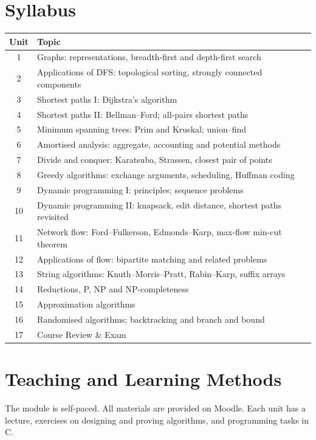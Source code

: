 \documentclass[11pt,a4paper]{article}
\begin{document}
\section{Syllabus}
\begin{tabularx}{\textwidth}{c X}
\toprule
\textbf{Unit} & \textbf{Topic} \\
\midrule
1  & Graphs: representations, breadth-first and depth-first search \\
2  & Applications of DFS: topological sorting, strongly connected components \\
3  & Shortest paths I: Dijkstra's algorithm \\
4  & Shortest paths II: Bellman--Ford; all-pairs shortest paths \\
5  & Minimum spanning trees: Prim and Kruskal; union--find \\
6  & Amortised analysis: aggregate, accounting and potential methods \\
7  & Divide and conquer: Karatsuba, Strassen, closest pair of points \\
8  & Greedy algorithms: exchange arguments, scheduling, Huffman coding \\
9  & Dynamic programming I: principles; sequence problems \\
10 & Dynamic programming II: knapsack, edit distance, shortest paths revisited \\
11 & Network flow: Ford--Fulkerson, Edmonds--Karp, max-flow min-cut theorem \\
12 & Applications of flow: bipartite matching and related problems \\
13 & String algorithms: Knuth--Morris--Pratt, Rabin--Karp, suffix arrays \\
14 & Reductions, P, NP and NP-completeness \\
15 & Approximation algorithms \\
16 & Randomised algorithms; backtracking and branch and bound \\
17 & Course Review \& Exam \\
\bottomrule
\end{tabularx}

\section{Teaching and Learning Methods}
The module is self-paced. All materials are provided on Moodle.
Each unit has a lecture, exercises on designing and proving algorithms, and
programming tasks in C.
\end{document}

